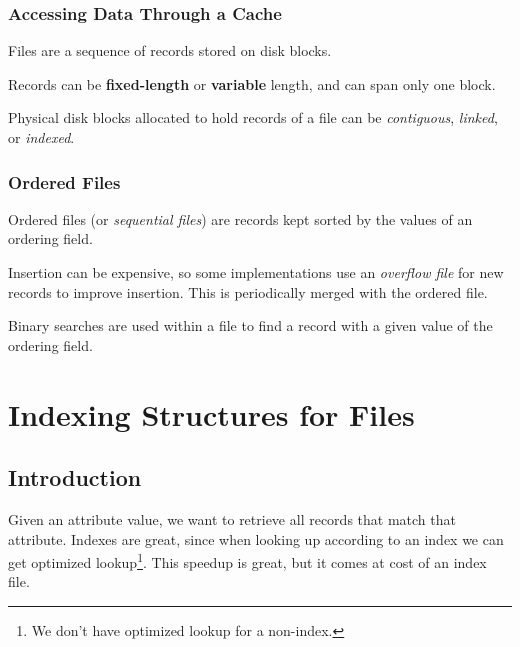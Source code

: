                 \subsection{Accessing Data Through a Cache} %
                \label{sub:accessing_data_through_a_cache}
                    Files are a sequence of records stored on disk blocks.

                    Records can be \textbf{fixed-length} or \textbf{variable} length, and can span only one block.

                    Physical disk blocks allocated to hold records of a file can be \textit{contiguous}, \textit{linked}, or \textit{indexed}.
                \subsection{Ordered Files} %
                \label{sub:ordered_files}
                    Ordered files (or \textit{sequential files}) are records kept sorted by the values of an ordering field.

                    Insertion can be expensive,
					so some implementations use an \textit{overflow file} for new records to improve insertion.
					This is periodically merged with the ordered file.

                    Binary searches are used within a file to find a record with a given value of the ordering field.
        \chapter{Indexing Structures for Files} %
        \label{cha:indexing_structures_for_files}
            \section{Introduction} %
            \label{sec:introduction}
                Given an attribute value, we want to retrieve all records that match that attribute.
                Indexes are great,
				since when looking up according to an index we can get optimized lookup\footnote{We don't have optimized lookup for a non-index.}.
                This speedup is great, but it comes at cost of an index file.
